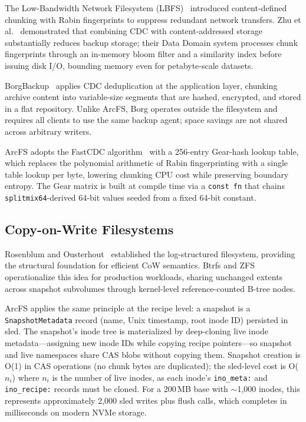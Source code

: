 \documentclass[journal]{IEEEtran}
\begin{document}
The Low-Bandwidth Network Filesystem (LBFS)~\cite{muthitacharoen2001lbfs}
introduced content-defined chunking with Rabin fingerprints to suppress
redundant network transfers. Zhu et al.~\cite{zhu2008dedup} demonstrated
that combining CDC with content-addressed storage substantially reduces
backup storage; their Data Domain system processes chunk fingerprints
through an in-memory bloom filter and a similarity index before issuing
disk I/O, bounding memory even for petabyte-scale datasets.

BorgBackup~\cite{borgbackup2024} applies CDC deduplication at the
application layer, chunking archive content into variable-size segments
that are hashed, encrypted, and stored in a flat repository.  Unlike ArcFS,
Borg operates outside the filesystem and requires all clients to use the
same backup agent; space savings are not shared across arbitrary writers.

ArcFS adopts the FastCDC algorithm~\cite{xia2016fastcdc} with a 256-entry
Gear-hash lookup table, which replaces the polynomial arithmetic of Rabin
fingerprinting with a single table lookup per byte, lowering chunking CPU
cost while preserving boundary entropy.  The Gear matrix is built at compile
time via a \texttt{const fn} that chains \texttt{splitmix64}-derived 64-bit
values seeded from a fixed 64-bit constant.

\subsection{Copy-on-Write Filesystems}

Rosenblum and Ousterhout~\cite{rosenblum1992lfs} established the
log-structured filesystem, providing the structural foundation for efficient
CoW semantics. Btrfs and ZFS operationalize this idea for production
workloads, sharing unchanged extents across snapshot subvolumes through
kernel-level reference-counted B-tree nodes.

ArcFS applies the same principle at the recipe level: a snapshot is a
\texttt{SnapshotMetadata} record (name, Unix timestamp, root inode ID)
persisted in sled.  The snapshot's inode tree is materialized by deep-cloning
live inode metadata---assigning new inode IDs while copying recipe
pointers---so snapshot and live namespaces share CAS blobs without copying
them.  Snapshot creation is O(1) in CAS operations (no chunk bytes are
duplicated); the sled-level cost is O($n_i$) where $n_i$ is the number of
live inodes, as each inode's \texttt{ino\_meta:} and \texttt{ino\_recipe:}
records must be cloned.  For a 200\,MB base with $\sim$1{,}000 inodes, this
represents approximately 2{,}000 sled writes plus flush calls, which
completes in milliseconds on modern NVMe storage.
\end{document}
